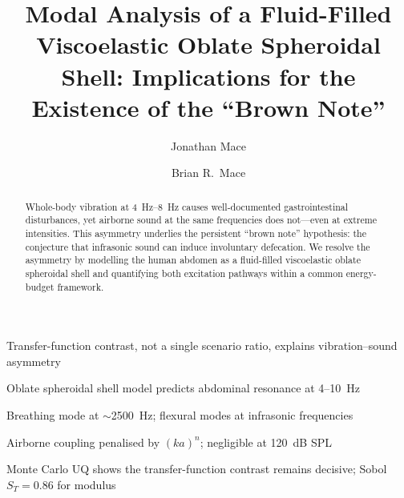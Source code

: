 \documentclass[review]{elsarticle}
\begin{document}
\begin{frontmatter}

\title{Modal Analysis of a Fluid-Filled Viscoelastic Oblate Spheroidal Shell:
Implications for the Existence of the ``Brown Note''}

\author[msr]{Jonathan Mace}

\author[auckland]{Brian R.\ Mace}



\begin{highlights}
\item Transfer-function contrast, not a single scenario ratio, explains vibration--sound asymmetry
\item Oblate spheroidal shell model predicts abdominal resonance at 4--10~Hz
\item Breathing mode at $\sim$2500~Hz; flexural modes at infrasonic frequencies
\item Airborne coupling penalised by $(ka)^n$; negligible at 120~dB SPL
\item Monte Carlo UQ shows the transfer-function contrast remains decisive; Sobol $S_T = 0.86$ for modulus
\end{highlights}

\begin{abstract}
Whole-body vibration at \SIrange{4}{8}{\hertz} causes well-documented
gastrointestinal disturbances, yet airborne sound at the same
frequencies does not---even at extreme intensities.  This asymmetry
underlies the persistent ``brown note'' hypothesis: the conjecture that
infrasonic sound can induce involuntary defecation.  We resolve the
asymmetry by modelling the human abdomen as a fluid-filled viscoelastic
oblate spheroidal shell and quantifying both excitation pathways within
a common energy-budget framework.


\end{abstract}
\end{frontmatter}
\end{document}
